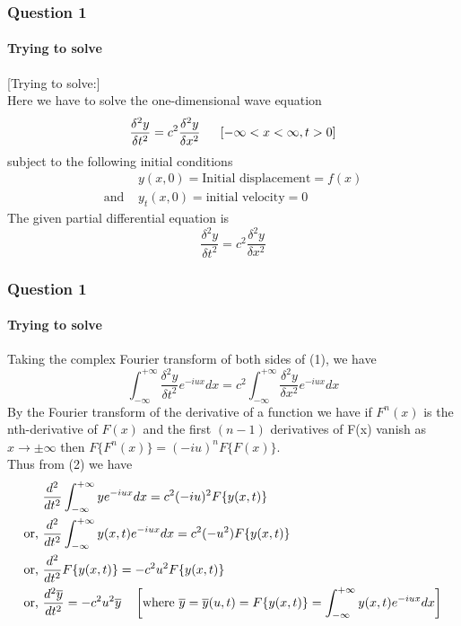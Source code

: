 \documentclass[9 pt]{beamer}
\begin{document}
\begin{frame}[fragile]
	\frametitle{Question 1}
	\framesubtitle{Trying to solve}
	[Trying to solve:]  \\
	Here we have to solve the one-dimensional wave equation
	$$\frac{\delta^2y}{\delta t^2}=c^2\frac{\delta^2y}{\delta x^2} \hspace{0.5cm}\left[-\infty < x < \infty, t>0\right]$$
	subject to the following initial conditions
	\begin{align*}
		              & y(x,0)=\textrm{Initial displacement}=f(x) \\
		\textrm{and } & y_t(x,0)=\textrm{initial velocity}=0
	\end{align*}
	The given partial differential equation is
	\begin{equation}
		\frac{\delta^2y}{\delta t^2}=c^2\frac{\delta^2y}{\delta x^2}
	\end{equation}
	\transfade[duration=0.6]
\end{frame}


\begin{frame}
	\frametitle{Question 1}
	\framesubtitle{Trying to solve}
	Taking the complex Fourier transform of both sides of (1), we have
	\begin{equation}
		\int_{-\infty}^{+\infty}\frac{\delta^2y}{\delta t^2}e^{-iux} dx=c^2\int_{-\infty}^{+\infty}\frac{\delta^2y}{\delta x^2}e^{-iux} dx
	\end{equation}
	By the Fourier transform of the derivative of a function we have if $F^n(x)$ is the nth-derivative of $F(x)$ and the first $(n-1)$ derivatives of F(x) vanish as $x \rightarrow \pm \infty$ then $F\{F^n(x)\}=(-iu)^n F\{F(x)\}$. \\
	Thus from (2) we have
	\begin{align*}
		              & \frac{d^2}{dt^2}\int_{-\infty}^{+\infty}ye^{-iux} dx =c^2(-iu)^2F\{y(x,t)\} \\
		\textrm{or, } & \frac{d^2}{dt^2}\int_{-\infty}^{+\infty}y(x,t)e^{-iux} dx =c^2(-u^2) F\{y(x,t)\} \\
		\textrm{or, } & \frac{d^2}{dt^2}F\{y(x,t)\} =-c^2u^2 F\{y(x,t)\} \\
		\textrm{or, } & \frac{d^2\overline{y}}{dt^2} =-c^2u^2\overline{y} \hspace{0.35cm}\left[\textrm{where }\overline{y}=\overline{y}(u,t)=F\{y(x,t)\}=\int_{-\infty}^{+\infty}y(x,t)e^{-iux} dx\right]
	\end{align*}
	\transwipe[duration=0.6]
\end{frame}
\end{document}
